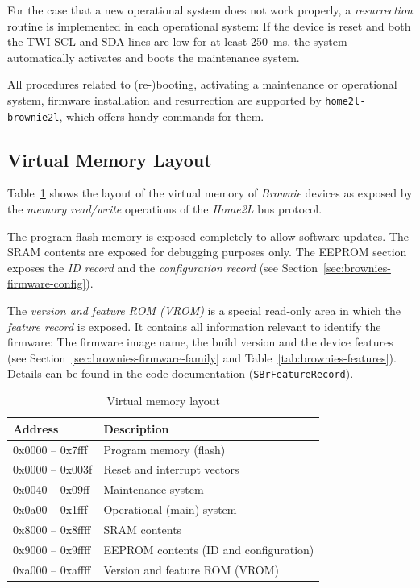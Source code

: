 \documentclass[12pt,english,parskip=half,headheight=19pt]{scrreprt}
\newcommand{\idx}[1]{#1\index{#1}}
\newcommand{\reftool}[1]{\hyperref[tool:#1]{\texttt{\idx{#1}}}}
\newcommand{\refapic}[1]{\href{home2l-api_c/index.html}{\mbox{\texttt{#1}}}}            %
\begin{document}
For the case that a new operational system does not work properly, a \textit{resurrection} routine is implemented in each operational system: If the device is reset and both the TWI SCL and SDA lines are low for at least 250~ms, the system automatically activates and boots the maintenance system.

All procedures related to (re-)booting, activating a maintenance or operational system, firmware installation and resurrection are supported by \reftool{home2l-brownie2l}, which offers handy commands for them.



\subsection{Virtual Memory Layout}
\label{sec:brownies-firmware-memory}

Table~\ref{tab:brownies-memory} shows the layout of the virtual memory of \textit{Brownie} devices as exposed by the \textit{memory read/write} operations of the \textit{Home2L} bus protocol.

The program flash memory is exposed completely to allow software updates. The SRAM contents are exposed for debugging purposes only. The EEPROM section exposes the \textit{ID record} and the \textit{configuration record} (see Section~\ref{sec:brownies-firmware-config}).

The \textit{version and feature ROM (VROM)} is a special read-only area in which the \textit{feature record} is exposed. It contains all information relevant to identify the firmware: The firmware image name, the build version and the device features (see Section~\ref{sec:brownies-firmware-family} and Table~\ref{tab:brownies-features}). Details can be found in the code documentation (\refapic{SBrFeatureRecord}).


\begin{table}[ht]
  \centering
  \renewcommand{\arraystretch}{1.4}
  \begin{tabular}{l|l}
    Address & Description \\
    \hline \hline
    0x0000 -- 0x7fff         & Program memory (flash) \\
    \qquad 0x0000 -- 0x003f  & \qquad Reset and interrupt vectors \\
    \qquad 0x0040 -- 0x09ff  & \qquad Maintenance system \\
    \qquad 0x0a00 -- 0x1fff  & \qquad Operational (main) system \\
    \hline
    0x8000 -- 0x8ffff        & SRAM contents \\
    \hline
    0x9000 -- 0x9ffff        & EEPROM contents (ID and configuration) \\
    \hline
    0xa000 -- 0xaffff        & Version and feature ROM (VROM) \\
  \end{tabular}
  \caption[l]{Virtual memory layout}
  \label{tab:brownies-memory}
\end{table}
\end{document}
